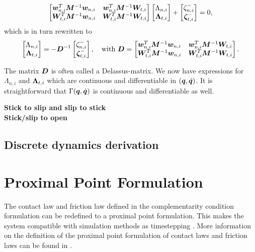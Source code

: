 \documentclass[../DC2017114Bouma.tex]{subfiles}
\begin{document}
\begin{align}
\begin{bmatrix}
{\boldsymbol{w}}_{n,i}^T{\boldsymbol{M}}^{-1}{\boldsymbol{w}}_{n,i} & {\boldsymbol{w}}_{n,i}^T{\boldsymbol{M}}^{-1}{\boldsymbol{W}}_{t,i} \\
{\boldsymbol{W}}_{t,i}^T{\boldsymbol{M}}^{-1}{\boldsymbol{w}}_{n,i} & {\boldsymbol{W}}_{t,i}^T{\boldsymbol{M}}^{-1}{\boldsymbol{W}}_{t,i}
\end{bmatrix}
\begin{bmatrix}
\Lambda_{n,i}\\
\boldsymbol{\Lambda}_{t,i}
\end{bmatrix} + \begin{bmatrix}
\zeta_{n,i}^-\\
\boldsymbol{\zeta}_{t,i}^-
\end{bmatrix}
= 0,
\end{align}
which is in turn rewritten to
\begin{align}
\begin{bmatrix}
\Lambda_{n,i}\\
\boldsymbol{\Lambda}_{t,i}
\end{bmatrix} = - {\boldsymbol{D}}^{-1}\begin{bmatrix}
\zeta_{n,i}^-\\
\boldsymbol{\zeta}_{t,i}^-
\end{bmatrix},\quad \text{with } {\boldsymbol{D}} = \begin{bmatrix}
{\boldsymbol{w}}_{n,i}^T{\boldsymbol{M}}^{-1}{\boldsymbol{w}}_{n,i} & {\boldsymbol{w}}_{n,i}^T{\boldsymbol{M}}^{-1}{\boldsymbol{W}}_{t,i} \\
{\boldsymbol{W}}_{t,i}^T{\boldsymbol{M}}^{-1}{\boldsymbol{w}}_{n,i} & {\boldsymbol{W}}_{t,i}^T{\boldsymbol{M}}^{-1}{\boldsymbol{W}}_{t,i}
\end{bmatrix}.
\end{align}

The matrix ${\boldsymbol{D}}$ is often called a Delassus-matrix. We now have expressions for $\Lambda_{n,i}$ and $\boldsymbol{\Lambda}_{t,i}$ which are continuous and differentiable in $({\boldsymbol{q}},\dot{{\boldsymbol{q}}})$. It is straightforward that $\Gamma({\boldsymbol{q}},\dot{{\boldsymbol{q}}})$ is continuous and differentiable as well.

\textbf{Stick to slip and slip to stick}\\

\textbf{Stick/slip to open}\\

\subsection{Discrete dynamics derivation}
\section{Proximal Point Formulation}
The contact law and friction law defined in the complementarity condition formulation can be redefined to a proximal point formulation. This makes the system compatible with simulation methods as timestepping \cite[Chapter 10]{Acary2008}. More information on the definition of the proximal point formulation of contact laws and friction laws can be found in \cite[Section 5.3]{Leine2008}.
\end{document}

